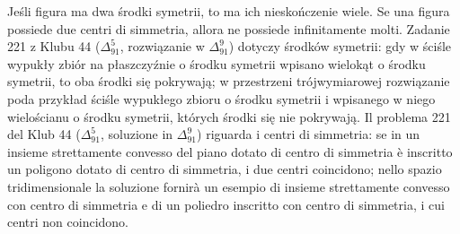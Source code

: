 Jeśli figura ma dwa środki symetrii, to ma ich nieskończenie wiele. %
Se una figura possiede due centri di simmetria, allora ne possiede infinitamente molti. %
Zadanie 221 z Klubu 44 ($\Delta_{91}^{5}$, rozwiązanie w $\Delta_{91}^{9}$) dotyczy środków symetrii: gdy w ściśle wypukły zbiór na płaszczyźnie o środku symetrii wpisano wielokąt o środku symetrii, to oba środki się pokrywają; w przestrzeni trójwymiarowej rozwiązanie poda przykład ściśle wypukłego zbioru o środku symetrii i wpisanego w niego wielościanu o środku symetrii, których środki się nie pokrywają. %
Il problema 221 del Klub 44 ($\Delta_{91}^{5}$, soluzione in $\Delta_{91}^{9}$) riguarda i centri di simmetria: se in un insieme strettamente convesso del piano dotato di centro di simmetria è inscritto un poligono dotato di centro di simmetria, i due centri coincidono; nello spazio tridimensionale la soluzione fornirà un esempio di insieme strettamente convesso con centro di simmetria e di un poliedro inscritto con centro di simmetria, i cui centri non coincidono. %

%